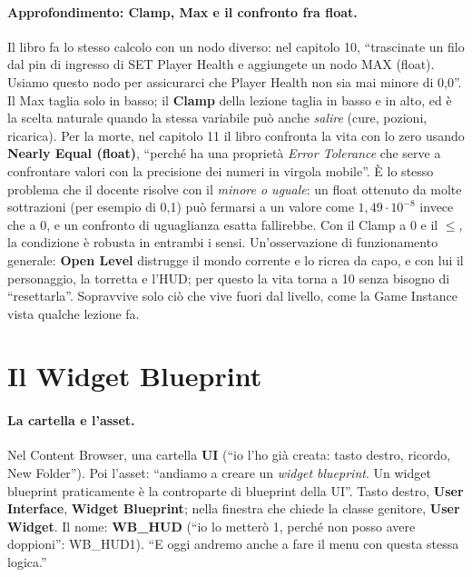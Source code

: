 \paragraph{Approfondimento: Clamp, Max e il confronto fra float.} Il libro fa lo stesso
calcolo con un nodo diverso: nel capitolo 10, ``trascinate un filo dal pin di ingresso di
SET Player Health e aggiungete un nodo MAX (float). Usiamo questo nodo per assicurarci che
Player Health non sia mai minore di 0,0''. Il Max taglia solo in basso; il \textbf{Clamp}
della lezione taglia in basso e in alto, ed è la scelta naturale quando la stessa
variabile può anche \emph{salire} (cure, pozioni, ricarica). Per la morte, nel capitolo 11
il libro confronta la vita con lo zero usando \textbf{Nearly Equal (float)}, ``perché ha
una proprietà \emph{Error Tolerance} che serve a confrontare valori con la precisione dei
numeri in virgola mobile''. È lo stesso problema che il docente risolve con il
\emph{minore o uguale}: un float ottenuto da molte sottrazioni (per esempio di 0,1) può
fermarsi a un valore come $1{,}49\cdot 10^{-8}$ invece che a 0, e un confronto di
uguaglianza esatta fallirebbe. Con il Clamp a 0 e il $\le$, la condizione è robusta in
entrambi i sensi. Un'osservazione di funzionamento generale: \textbf{Open Level} distrugge
il mondo corrente e lo ricrea da capo, e con lui il personaggio, la torretta e l'HUD; per
questo la vita torna a 10 senza bisogno di ``resettarla''. Sopravvive solo ciò che vive
fuori dal livello, come la Game Instance vista qualche lezione fa.

\section{Il Widget Blueprint}
\label{ue11:sec:widget}

\paragraph{La cartella e l'asset.} Nel Content Browser, una cartella \textbf{UI} (``io
l'ho già creata: tasto destro, ricordo, New Folder''). Poi l'asset: ``andiamo a creare un
\emph{widget blueprint}. Un widget blueprint praticamente è la controparte di blueprint
della UI''. Tasto destro, \textbf{User Interface}, \textbf{Widget Blueprint}; nella
finestra che chiede la classe genitore, \textbf{User Widget}. Il nome:
\textbf{WB\_HUD} (``io lo metterò 1, perché non posso avere doppioni'': WB\_HUD1). ``E oggi
andremo anche a fare il menu con questa stessa logica.''

